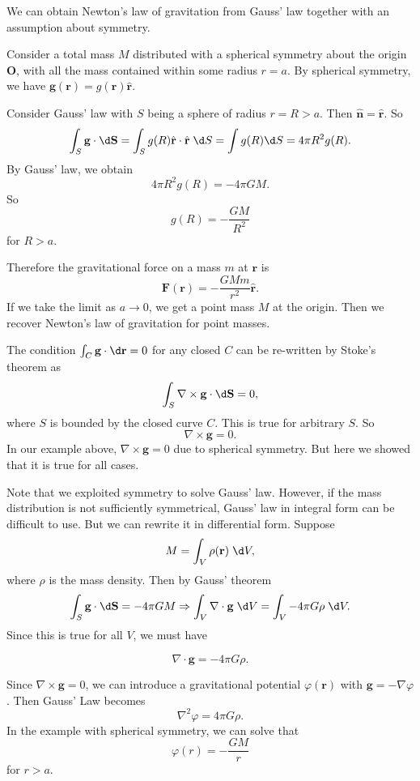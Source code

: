 \documentclass[a4paper]{article}
\begin{document}
\begin{eg}
  We can obtain Newton's law of gravitation from Gauss' law  together with an assumption about symmetry.

  Consider a total mass $M$ distributed with a spherical symmetry about the origin $\mathbf{O}$, with all the mass contained within some radius $r = a$. By spherical symmetry, we have $\mathbf{g}(\mathbf{r}) = g(\mathbf{r})\hat{\mathbf{r}}$.

  Consider Gauss' law with $S$ being a sphere of radius $r = R > a$. Then $\hat{\mathbf{n}} = \hat{\mathbf{r}}$. So
  \[
    \int_S \mathbf{g}\cdot \d \mathbf{S} = \int_S g(R)\hat{\mathbf{r}}\cdot \hat{\mathbf{r}}\;\d S = \int g(R)\d S = 4\pi R^2 g(R).
  \]
  By Gauss' law, we obtain
  \[
    4\pi R^2 g(R) = -4\pi GM.
  \]
  So
  \[
    g(R) = -\frac{GM}{R^2}
  \]
  for $R > a$.

  Therefore the gravitational force on a mass $m$ at $\mathbf{r}$ is
  \[
    \mathbf{F}(\mathbf{r}) = -\frac{GMm}{r^2}\hat{\mathbf{r}}.
  \]
  If we take the limit as $a\to 0$, we get a point mass $M$ at the origin. Then we recover Newton's law of gravitation for point masses.
\end{eg}

The condition $\int_C \mathbf{g}\cdot \d \mathbf{r} = 0$ for any closed $C$ can be re-written by Stoke's theorem as
\[
  \int_S \nabla\times \mathbf{g}\cdot \d \mathbf{S} = 0,
\]
where $S$ is bounded by the closed curve $C$. This is true for arbitrary $S$. So
\[
  \nabla\times \mathbf{g} = 0.
\]
In our example above, $\nabla\times \mathbf{g} = 0$ due to spherical symmetry. But here we showed that it is true for all cases.

Note that we exploited symmetry to solve Gauss' law. However, if the mass distribution is not sufficiently symmetrical, Gauss' law in integral form can be difficult to use. But we can rewrite it in differential form. Suppose
\[
  M = \int_V \rho(\mathbf{r})\;\d V,
\]
where $\rho$ is the mass density. Then by Gauss' theorem
\[
  \int_S \mathbf{g} \cdot \d \mathbf{S} = -4\pi GM \Rightarrow  \int_V \nabla\cdot \mathbf{g}\;\d V = \int_V -4\pi G\rho \;\d V.
\]
Since this is true for all $V$, we must have
\begin{law}
  \[
    \nabla\cdot \mathbf{g} = -4\pi G\rho.
  \]
\end{law}
Since $\nabla\times \mathbf{g} = 0$, we can introduce a gravitational potential $\varphi(\mathbf{r})$ with $\mathbf{g} = -\nabla \varphi$. Then Gauss' Law becomes
\[
  \nabla^2 \varphi = 4\pi G\rho.
\]
In the example with spherical symmetry, we can solve that
\[
  \varphi(r) = -\frac{GM}{r}
\]
for $r > a$.
\end{document}
